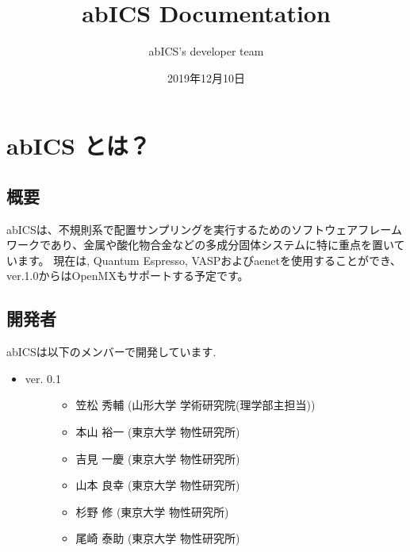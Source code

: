\documentclass[letterpaper,10pt,dvipdfmx]{sphinxmanual}
\title{abICS Documentation}
\date{2019年12月10日}
\author{abICS's developer team}
\begin{document}
\maketitle
\sphinxtableofcontents
{}\label{\detokenize{index::doc}}



\chapter{abICS とは？}
\label{\detokenize{about/index:abics}}\label{\detokenize{about/index::doc}}

\section{概要}
\label{\detokenize{about/info::doc}}\label{\detokenize{about/info:id1}}
abICSは、不規則系で配置サンプリングを実行するためのソフトウェアフレームワークであり、金属や酸化物合金などの多成分固体システムに特に重点を置いています。
現在は, Quantum Espresso, VASPおよびaenetを使用することができ、ver.1.0からはOpenMXもサポートする予定です。


\section{開発者}
\label{\detokenize{about/info:id2}}
abICSは以下のメンバーで開発しています.
\begin{itemize}
\item {} \begin{description}
\item[{ver. 0.1}] \leavevmode\begin{itemize}
\item {} 
笠松 秀輔 (山形大学 学術研究院(理学部主担当))

\item {} 
本山 裕一 (東京大学 物性研究所)

\item {} 
吉見 一慶 (東京大学 物性研究所)

\item {} 
山本 良幸 (東京大学 物性研究所)

\item {} 
杉野 修 (東京大学 物性研究所)

\item {} 
尾崎 泰助 (東京大学 物性研究所)

\end{itemize}

\end{description}

\end{itemize}
\end{document}
